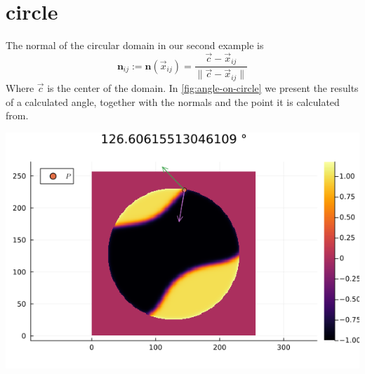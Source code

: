 \documentclass{mimosis}
\begin{document}
\section{circle}
\label{sec:org7b7369f}
The normal of the circular domain in our second example is
\begin{equation}
\label{eq:3}
\mathbf{n}_{ij} := \mathbf{n}(\vec{x}_{ij}) = \frac{\vec{c} - \vec{x}_{ij}}{\| \vec{c} - \vec{x}_{ij}\|}
\end{equation}
Where \(\vec{c}\) is the center of the domain.
In \ref{fig:angle-on-circle} we present the results of a calculated angle, together with the normals and the point it is calculated from.
\begin{center}
\includegraphics[width=.9\linewidth]{images/angle-circle.png}
\label{fig:angle-on-circle}
\end{center}
\end{document}
